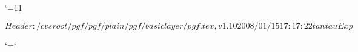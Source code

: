 %
%
%


\edef\pgfatcode{\the\catcode`\@}
\catcode`\@=11



\ProvidesPackageRCS $Header: /cvsroot/pgf/pgf/plain/pgf/basiclayer/pgf.tex,v 1.10 2008/01/15 17:17:22 tantau Exp $




%
%
%

\catcode`\@=\pgfatcode

\endinput
